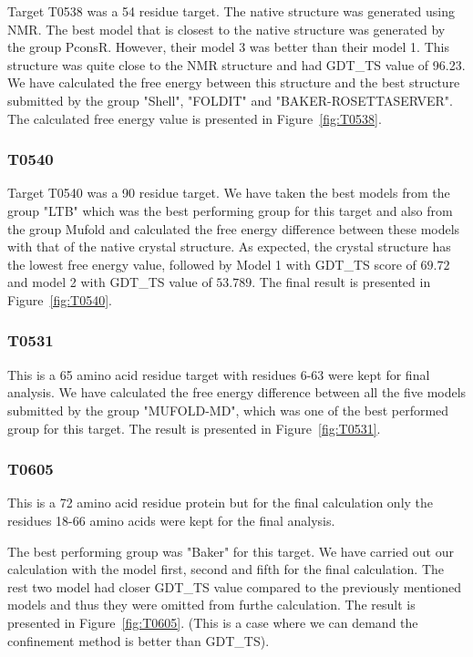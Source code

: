 \documentclass[12pt]{article}
\begin{document}
Target T0538 was a 54 residue target. The native structure was generated using NMR. The best model
that is closest to the native structure was generated by the group PconsR. However, their model 3
was better than their model 1. This structure was quite close to the NMR structure and had GDT\_TS
value of 96.23. We have calculated the free energy between this structure and the best structure
submitted by the group "Shell", "FOLDIT" and "BAKER-ROSETTASERVER". The calculated free energy value
is presented in Figure~\ref{fig:T0538}.

\subsubsection{T0540}

Target T0540 was a 90 residue target. We have taken the best models from the group "LTB" which was
the best performing group for this target and also from the group Mufold and calculated the free
energy difference between these models with that of the native crystal structure.  As expected, the
crystal structure has the lowest free energy value, followed by Model 1 with GDT\_TS score of
$69.72$ and model 2 with GDT\_TS value of $53.789$. The final result is presented in
Figure~\ref{fig:T0540}.


\subsubsection{T0531}

This is a 65 amino acid residue target with residues 6-63 were kept for final analysis. We have
calculated the free energy difference between all the five models submitted by the group
"MUFOLD-MD", which was one of the best performed group for this target.  The result is presented in
Figure~\ref{fig:T0531}.



\subsubsection{T0605}

This is a 72 amino acid residue protein but for the final calculation only the residues 18-66 amino acids were kept for the final analysis.

The best performing group was "Baker" for this target. We have carried out our calculation with the model first, second and fifth for the
final calculation. The rest two model had closer GDT\_TS value compared to the previously mentioned models and thus they were omitted from
furthe calculation. The result is presented in Figure~\ref{fig:T0605}. (This is a case where we can demand the confinement
method is better than GDT\_TS).
\end{document}
